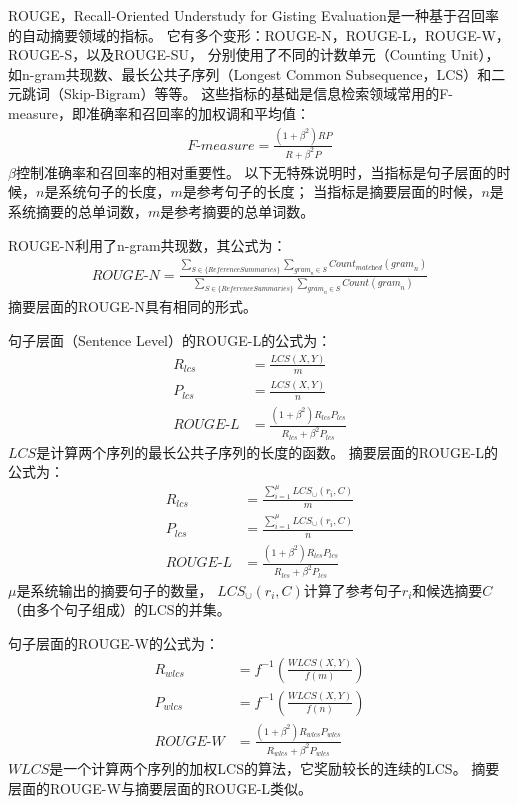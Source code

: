 ROUGE，Recall-Oriented Understudy for Gisting Evaluation是一种基于召回率的自动摘要领域的指标。
它有多个变形：ROUGE-N，ROUGE-L，ROUGE-W，ROUGE-S，以及ROUGE-SU，
分别使用了不同的计数单元（Counting Unit），如n-gram共现数、最长公共子序列（Longest Common Subsequence，LCS）和二元跳词（Skip-Bigram）等等。
这些指标的基础是信息检索领域常用的F-measure，即准确率和召回率的加权调和平均值：
\begin{align}
    \textit{F-measure} = \frac{(1 + \beta^2) RP}{R + \beta^2 P}
\end{align}
$\beta$控制准确率和召回率的相对重要性。
以下无特殊说明时，当指标是句子层面的时候，$n$是系统句子的长度，$m$是参考句子的长度；
当指标是摘要层面的时候，$n$是系统摘要的总单词数，$m$是参考摘要的总单词数。

ROUGE-N利用了n-gram共现数，其公式为：
\begin{align}
    \textit{ROUGE-N} = \frac{
    \sum_{S \in \{\textit{ReferenceSummaries}\}}
    \sum_{\textit{gram}_n \in S}
    \textit{Count}_\textit{matched}(\textit{gram}_n)
    }{
    \sum_{S \in \{\textit{ReferenceSummaries}\}}
    \sum_{\textit{gram}_n \in S}
    \textit{Count}(\textit{gram}_n)
    }
\end{align}
摘要层面的ROUGE-N具有相同的形式。

句子层面（Sentence Level）的ROUGE-L的公式为：
\begin{align}
    R_{lcs} &= \frac{\textit{LCS}(X, Y)}{m} \\
    P_{lcs} &= \frac{\textit{LCS}(X, Y)}{n} \\
    \textit{ROUGE-L} &= \frac{(1 + \beta^2) R_{lcs}P_{lcs}}
    {R_{lcs} + \beta^2 P_{lcs}}
\end{align}
$LCS$是计算两个序列的最长公共子序列的长度的函数。
摘要层面的ROUGE-L的公式为：
\begin{align}
    R_{lcs} &= \frac{\sum_{i=1}^\mu \textit{LCS}_\cup(r_i, C)}{m} \\
    P_{lcs} &= \frac{\sum_{i=1}^\mu \textit{LCS}_\cup(r_i, C)}{n} \\
    \textit{ROUGE-L} &= \frac{(1 + \beta^2) R_{lcs}P_{lcs}}{R_{lcs} + \beta^2 P_{lcs}}
\end{align}
$\mu$是系统输出的摘要句子的数量， $\textit{LCS}_\cup(r_i, C)$计算了参考句子$r_i$和候选摘要$C$（由多个句子组成）的LCS的并集。

句子层面的ROUGE-W的公式为：
\begin{align}
    R_{wlcs} &= f^{-1} \left( \frac{\textit{WLCS}(X, Y)}{f(m)} \right) \\
    P_{wlcs} &= f^{-1} \left( \frac{\textit{WLCS}(X, Y)}{f(n)} \right) \\
    \textit{ROUGE-W} &= \frac{(1 + \beta^2) R_{wlcs}P_{wlcs}}{R_{wlcs} + \beta^2 P_{wlcs}}
\end{align}
$\textit{WLCS}$是一个计算两个序列的加权LCS的算法，它奖励较长的连续的LCS。
摘要层面的ROUGE-W与摘要层面的ROUGE-L类似。

